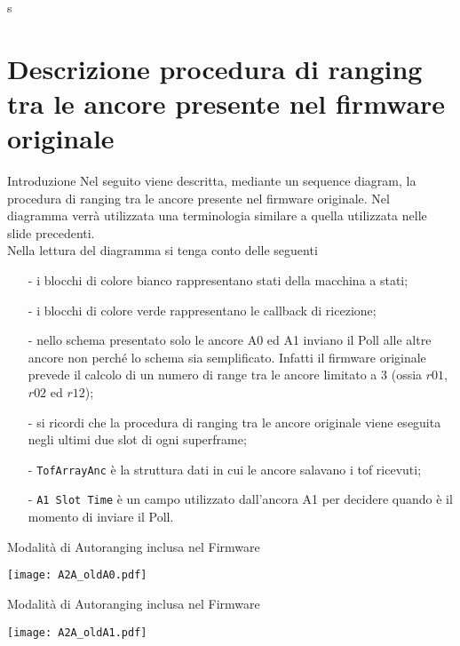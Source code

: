 s\section{Descrizione procedura di ranging tra le ancore presente nel firmware originale}
\begin{frame}[shrink=10]{Introduzione}
  Nel seguito viene descritta, mediante un sequence diagram, la procedura di ranging tra le ancore
  presente nel firmware originale. Nel diagramma verrà utilizzata una terminologia similare a quella utilizzata nelle slide precedenti.\\
  Nella lettura del diagramma si tenga conto delle seguenti
  \begin{itemize}
  \item[-] i blocchi di colore bianco rappresentano stati della macchina a stati;
  \item[-] i blocchi di colore verde rappresentano le callback di ricezione;
  \item[-] nello schema presentato \alert{solo} le ancore A0 ed A1 inviano il Poll alle altre ancore
    non perché lo schema sia semplificato. Infatti il firmware originale prevede
    il calcolo di un numero di range tra le ancore limitato a $3$ (ossia $r01$, $r02$ ed $r12$);
  \item[-] si ricordi che la procedura di ranging tra le ancore originale viene eseguita negli ultimi
    due slot di ogni superframe;
  \item[-] \lstinline!TofArrayAnc! è la struttura dati in cui le ancore salavano i tof ricevuti;
  \item[-] \lstinline!A1 Slot Time! è un campo utilizzato dall'ancora A1 per decidere quando è il momento
    di inviare il Poll.
  \end{itemize}
  
\end{frame}

\begin{frame}{Modalità di Autoranging inclusa nel Firmware}  
  \begin{center}
    \texttt{[image: A2A\_oldA0.pdf]}
  \end{center}
\end{frame}

\begin{frame}{Modalità di Autoranging inclusa nel Firmware}
  \begin{center}
    \texttt{[image: A2A\_oldA1.pdf]}
  \end{center}
\end{frame}

